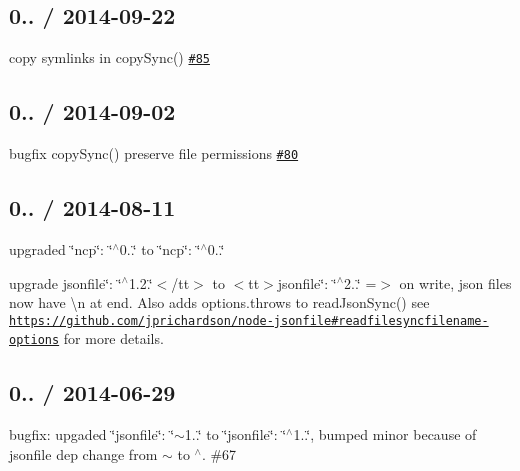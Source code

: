 \subsection*{0.. / 2014-\/09-\/22 }


\begin{DoxyItemize}
\item copy symlinks in {\ttfamily copy\+Sync()} \href{https://github.com/jprichardson/node-fs-extra/pull/85}{\tt \#85}
\end{DoxyItemize}

\subsection*{0.. / 2014-\/09-\/02 }


\begin{DoxyItemize}
\item bugfix {\ttfamily copy\+Sync()} preserve file permissions \href{https://github.com/jprichardson/node-fs-extra/pull/80}{\tt \#80}
\end{DoxyItemize}

\subsection*{0.. / 2014-\/08-\/11 }


\begin{DoxyItemize}
\item upgraded {\ttfamily \char`\"{}ncp\char`\"{}\+: \char`\"{}$^\wedge$0..\char`\"{}} to {\ttfamily \char`\"{}ncp\char`\"{}\+: \char`\"{}$^\wedge$0..\char`\"{}}
\item upgrade {\ttfamily jsonfile\char`\"{}\+: \char`\"{}$^\wedge$1.2.\char`\"{}$<$/tt$>$ to $<$tt$>$jsonfile\char`\"{}\+: \char`\"{}$^\wedge$2..\char`\"{}} =$>$ on write, json files now have {\ttfamily \textbackslash{}n} at end. Also adds {\ttfamily options.\+throws} to {\ttfamily read\+Json\+Sync()} see \href{https://github.com/jprichardson/node-jsonfile#readfilesyncfilename-options}{\tt https\+://github.\+com/jprichardson/node-\/jsonfile\#readfilesyncfilename-\/options} for more details.
\end{DoxyItemize}

\subsection*{0.. / 2014-\/06-\/29 }


\begin{DoxyItemize}
\item bugfix\+: upgaded {\ttfamily \char`\"{}jsonfile\char`\"{}\+: \char`\"{}$\sim$1..\char`\"{}} to {\ttfamily \char`\"{}jsonfile\char`\"{}\+: \char`\"{}$^\wedge$1..\char`\"{}}, bumped minor because of {\ttfamily jsonfile} dep change from {\ttfamily $\sim$} to {\ttfamily $^\wedge$}. \#67
\end{DoxyItemize}

